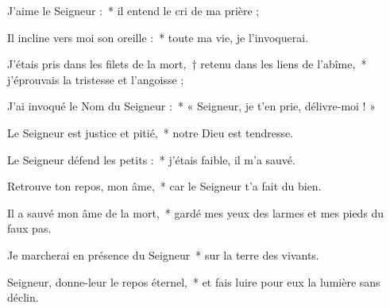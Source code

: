 \item J'aime le Seigneur :~* il entend le cri de ma prière ;

\item Il incline vers moi son oreille :~* toute ma vie, je l'invoquerai.

\item J'étais pris dans les filets de la mort,~† retenu dans les liens de l'abîme,~* j'éprouvais la tristesse et l'angoisse ;

\item J'ai invoqué le Nom du Seigneur :~* « Seigneur, je t'en prie, délivre-moi ! »

\item Le Seigneur est justice et pitié,~* notre Dieu est tendresse.

\item Le Seigneur défend les petits :~* j'étais faible, il m'a sauvé.

\item Retrouve ton repos, mon âme,~* car le Seigneur t'a fait du bien.

\item Il a sauvé mon âme de la mort,~* gardé mes yeux des larmes et mes pieds du faux pas.

\item Je marcherai en présence du Seigneur~* sur la terre des vivants.

\item Seigneur, donne-leur le repos éternel,~* et fais luire pour eux la lumière sans déclin.